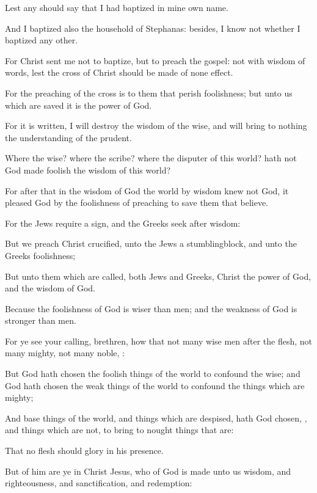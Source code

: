 {Lest
any should
say
that I had
baptized
in mine
own
name.

And I
baptized
also the
household of
Stephanas:
besides, I
know
not
whether I
baptized
any
other.

For
Christ
sent
me
not to
baptize,
but to preach the
gospel:
not
with
wisdom of
words,
lest the
cross of
Christ should be made of none
effect.


\par }{\PP {}For the
preaching of the
cross
is to
them that
perish
foolishness;
but unto
us which are
saved it
is the
power of
God.

For it is
written, I will
destroy the
wisdom of the
wise,
and will bring to
nothing the
understanding of the
prudent.

Where
{} the
wise?
where
{} the
scribe?
where
{} the
disputer of
this
world? hath
not
God made
foolish the
wisdom of
this
world?

For after
that
in the
wisdom of
God the
world
by
wisdom
knew
not
God, it
pleased
God
by the
foolishness of
preaching to
save
them that
believe.

For the
Jews
require a
sign,
and the
Greeks
seek after
wisdom:

But
we
preach
Christ
crucified, unto the
Jews a
stumblingblock,
and unto the
Greeks
foolishness;

But unto
them
which are
called,
both
Jews
and
Greeks,
Christ the
power of
God,
and the
wisdom of
God.

Because the
foolishness of
God
is
wiser than
men;
and the
weakness of
God
is
stronger than
men.

For ye
see
your
calling,
brethren, how
that
not
many wise
men
after the
flesh,
not
many
mighty,
not
many
noble,
{}:

But
God hath
chosen the foolish
things of the
world
to
confound the
wise;
and
God hath
chosen the weak
things of the
world
to
confound the
things which are
mighty;

And base
things of the
world,
and
things which are
despised,
hath
God
chosen,
{},
and
things which
are
not,
to bring to
nought
things that
are:

That
no
flesh should
glory
in
his
presence.

But
of
him
are
ye
in
Christ
Jesus,
who
of
God is
made unto
us
wisdom,
and
righteousness,
and
sanctification,
and
redemption:

}
